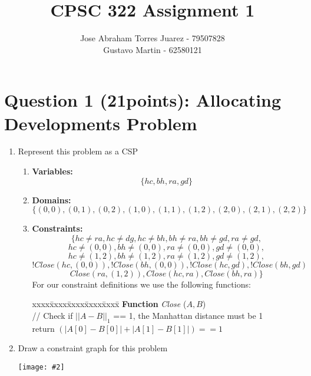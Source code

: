 \documentclass{article}
\def\ans#1{{\color{ans}#1}}
\newcommand{\centerfig}[2]{\begin{center}\texttt{[image: \#2]}\end{center}}
\begin{document}
\title{CPSC 322 Assignment 1}
\author{
    Jose Abraham Torres Juarez - 79507828 \\
    Gustavo Martin - 62580121
}
\date{}
\maketitle
\vspace{-2em}


\section{Question 1 (21points): Allocating Developments Problem}

\begin{enumerate}[label=(\alph*)]
    \item Represent this problem as a CSP
    \begin{enumerate}\color{ans}
        \item \textbf{Variables: }
        \[
            \{ hc, bh, ra, gd \}
        \]
        \item \textbf{Domains: }
        \[
            \{ (0,0), (0,1), (0,2), (1,0), (1,1), (1,2), (2,0), (2,1), (2,2) \}
        \]
        \item \textbf{Constraints: }
        \[
            \{ hc \neq ra, hc \neq dg, hc \neq bh, bh \neq ra, bh \neq gd, ra \neq gd,
        \]
        \[
            hc \neq (0,0), bh \neq (0,0), ra \neq (0,0), gd \neq (0,0),
        \]
        \[
            hc \neq (1,2), bh \neq (1,2), ra \neq (1,2), gd \neq (1,2),
        \]
        \[
            !Close(hc,(0,0)), !Close(bh,(0,0)), !Close(hc,gd), !Close(bh,gd)
        \]
        \[
            Close(ra,(1,2)), Close(hc,ra), Close(bh,ra) \}
        \]
        \ans{
            For our constraint definitions we use the following functions:
        }
        \begin{tabbing}
        xxxx\=xxxx\=xxxx\=xxxx\=xxxx\= \kill \color{ans}
        {\bf Function} {\em Close} ($A,B$)\\ [0pt \color{ans}]
        \> // Check if $|| A - B ||_1$ == 1, the Manhattan distance must be 1\\
        \> return $( |A[0] - B[0]| + |A[1] - B[1]| ) == 1$ \\
        \end{tabbing}
    \end{enumerate}
    \item Draw a constraint graph for this problem
    \centerfig{0.8}{../figs/q1.png}
\end{enumerate}
\end{document}
